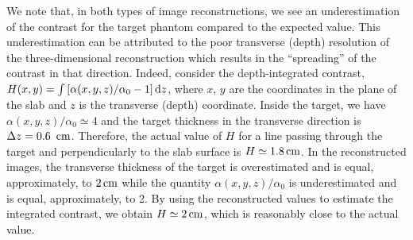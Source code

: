 We note that, in both types of image reconstructions, we see an underestimation of the contrast for the target phantom compared to the expected value. This underestimation can be attributed to the poor  transverse (depth) resolution of the three-dimensional reconstruction which results in the ``spreading'' of the contrast in that direction. Indeed, consider the depth-integrated contrast, $H(x,y) = \int \left[  \alpha(x,y,z) / \alpha_0 - 1 \right] {\rm d}z$, where $x$, $y$ are the coordinates in the plane of the slab and $z$ is the transverse (depth) coordinate. Inside the target, we have $\alpha(x,y,z) / \alpha_0 \simeq 4$ and the target thickness in the transverse direction is $\Delta z=0.6\,\ {\rm cm}$. Therefore, the actual value of $H$ for a line passing through the target and perpendicularly to the slab surface is $H\simeq 1.8\,{\rm cm}$. In the reconstructed images, the transverse thickness of the target is overestimated and is equal, approximately, to $2\,{\rm cm}$ while the quantity $\alpha(x,y,z)/\alpha_0$ is underestimated and is equal, approximately, to 2. By using the reconstructed values to estimate the integrated contrast, we obtain $H\simeq 2\,{\rm cm}$, which is reasonably close to the actual value.

